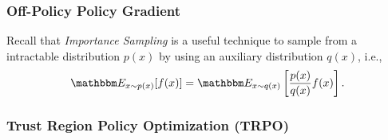     
    
\subsubsection{Off-Policy Policy Gradient}
Recall that \emph{Importance Sampling} is a useful technique to sample from a intractable distribution $p(x)$ by using an auxiliary distribution $q(x)$, i.e., 
    \begin{equation}
        \E_{x \sim p(x)}[f(x)] = \E_{x \sim q(x)}\left[ \frac{p(x)}{q(x)}f(x) \right].
    \end{equation}



\subsubsection{Trust Region Policy Optimization (TRPO)}



